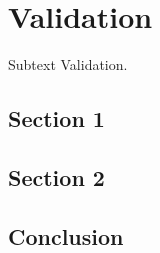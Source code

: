 \chapter{Validation}
\label{chap:validation}

Subtext Validation.

\minitoc

\newpage

\section{Section 1}



\section{Section 2}



\section{Conclusion}

